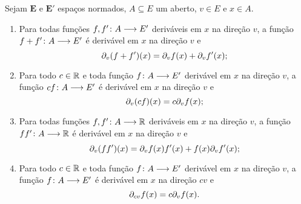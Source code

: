 \begin{proposition}
Sejam $\bm E$ e $\bm E'$ espaços normados, $A \subseteq E$ um aberto, $v \in E$ e $x \in A$.
	\begin{enumerate}
	\item Para todas funções $f,f'\colon \allowbreak A \longrightarrow E'$ deriváveis em $x$ na direção $v$, a função $f+f'\colon \allowbreak A \longrightarrow E'$ é derivável em $x$ na direção $v$ e
		\begin{equation*}
		\partial_{v} (f+f')(x) = \partial_{v} f(x) + \partial_{v} f'(x);
		\end{equation*}
	\item Para todo $c \in \mathbb{R}$ e toda função $f\colon \allowbreak A \longrightarrow E'$ derivável em $x$ na direção $v$, a função $cf\colon \allowbreak A \longrightarrow E'$ é derivável em $x$ na direção $v$ e
		\begin{equation*}
		\partial_{v} (cf)(x) = c\partial_{v} f(x);
		\end{equation*}
	\item Para todas funções $f,f'\colon \allowbreak A \longrightarrow \mathbb{R}$ deriváveis em $x$ na direção $v$, a função $ff'\colon \allowbreak A \longrightarrow \mathbb{R}$ é derivável em $x$ na direção $v$ e
		\begin{equation*}
		\partial_{v} (ff')(x) = \partial_{v} f(x) f'(x) + f(x) \partial_{v} f'(x);
		\end{equation*}
	\item Para todo $c \in \mathbb{R}$ e toda função $f\colon \allowbreak A \longrightarrow E'$ derivável em $x$ na direção $v$, a função $f\colon \allowbreak A \longrightarrow E'$ é derivável em $x$ na direção $cv$ e
		\begin{equation*}
		\partial_{cv} f(x) = c\partial_{v} f(x).
		\end{equation*}
	\end{enumerate}
\end{proposition}
